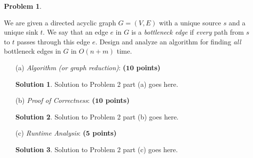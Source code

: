 \documentclass{article}
\theoremstyle{definition}
\newtheorem{problem}{Problem}
\newtheorem*{solution*}{Solution}
\newenvironment{solution}{\begin{solution*}}{{} \end{solution*}}
\newcommand{\grade}[1]{\hfill{\textbf{($\mathbf{#1}$ points)}}}
\begin{document}
\newpage


\begin{problem}\label{search}
	
	We are given a directed acyclic graph $G=(V,E)$ with a unique source $s$ and a unique sink $t$. We say that an edge $e$ in $G$ is a \emph{bottleneck edge} if \emph{every} path from $s$ to $t$ passes through this edge $e$. Design and analyze an algorithm 
	for finding \emph{all} bottleneck edges in $G$ in $O(n+m)$ time. 

\begin{enumerate}
	\item[(a)] \emph{Algorithm (or graph reduction)}: \grade{10} 
	
	
\begin{solution}
	Solution to Problem 2 part (a) goes here. 
\end{solution}

	\newpage
	\item[(b)] \emph{Proof of Correctness}: \grade{10} 
	
	
\begin{solution}
	Solution to Problem 2 part (b) goes here. 
\end{solution}

\bigskip

	\item[(c)] \emph{Runtime Analysis}: \grade{5} 
	
	
\begin{solution}
	Solution to Problem 2 part (c) goes here. 
\end{solution}

\end{enumerate}
	
\end{problem} 

\newpage
\end{document}
